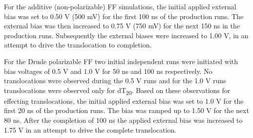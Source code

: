 For the additive (non-polarizable) FF simulations, the initial applied external bias was set to 0.50 V (500 mV) for the first 100 ns of the production runs. The external bias was then increased to 0.75 V (750 mV) for the next 150 ns in the production runs. Subsequently the external biases were increased to 1.00 V, in an attempt to drive the translocation to completion. 

For the Drude polarizable FF two initial independent runs were initiated with bias voltages of 0.5 V and 1.0 V for 50 ns and 100 ns respectively. No translocations were observed during the 0.5 V runs and for the 1.0 V runs translocations were observed only for dT\textsubscript{20}. Based on these observations for effecting translocations, the initial applied external bias was set to 1.0 V for the first 20 ns of the production runs. The bias was ramped up to 1.50 V for the next 80 ns. After the completion of 100 ns the applied external bias was increased to 1.75 V in an attempt to drive the complete translocation. 

